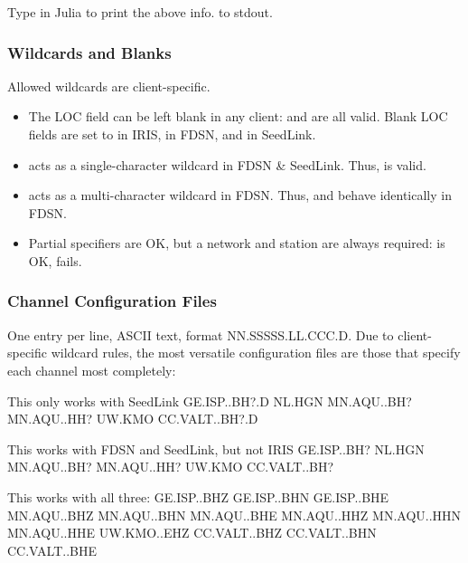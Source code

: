\documentclass[letterpaper,11pt,english]{sphinxmanual}
\begin{document}
Type  in Julia to print the above info. to stdout.


\subsubsection{Wildcards and Blanks}
\label{\detokenize{src/Appendices/web_syntax:wildcards-and-blanks}}
Allowed wildcards are client-specific.
\begin{itemize}
\item {} 
The LOC field can be left blank in any client:  and  are all valid. Blank LOC fields are set to \sphinxcode{\sphinxupquote{-{-}}} in IRIS, \sphinxcode{\sphinxupquote{*}} in FDSN, and  in SeedLink.

\item {} 
 acts as a single-character wildcard in FDSN \& SeedLink. Thus,  is valid.

\item {} 
\sphinxcode{\sphinxupquote{*}} acts as a multi-character wildcard in FDSN. Thus,  and  behave identically in FDSN.

\item {} 
Partial specifiers are OK, but a network and station are always required:  is OK,  fails.

\end{itemize}


\subsubsection{Channel Configuration Files}
\label{\detokenize{src/Appendices/web_syntax:channel-configuration-files}}\label{\detokenize{src/Appendices/web_syntax:ccfg}}
One entry per line, ASCII text, format NN.SSSSS.LL.CCC.D. Due to client-specific wildcard rules, the most versatile configuration files are those that specify each channel most completely:

%
\begin{sphinxVerbatim}[commandchars=\\\{\}]
\PYGZsh{} This only works with SeedLink
GE.ISP..BH?.D
NL.HGN
MN.AQU..BH?
MN.AQU..HH?
UW.KMO
CC.VALT..BH?.D

\PYGZsh{} This works with FDSN and SeedLink, but not IRIS
GE.ISP..BH?
NL.HGN
MN.AQU..BH?
MN.AQU..HH?
UW.KMO
CC.VALT..BH?

\PYGZsh{} This works with all three:
GE.ISP..BHZ
GE.ISP..BHN
GE.ISP..BHE
MN.AQU..BHZ
MN.AQU..BHN
MN.AQU..BHE
MN.AQU..HHZ
MN.AQU..HHN
MN.AQU..HHE
UW.KMO..EHZ
CC.VALT..BHZ
CC.VALT..BHN
CC.VALT..BHE
\end{sphinxVerbatim}
\end{document}
